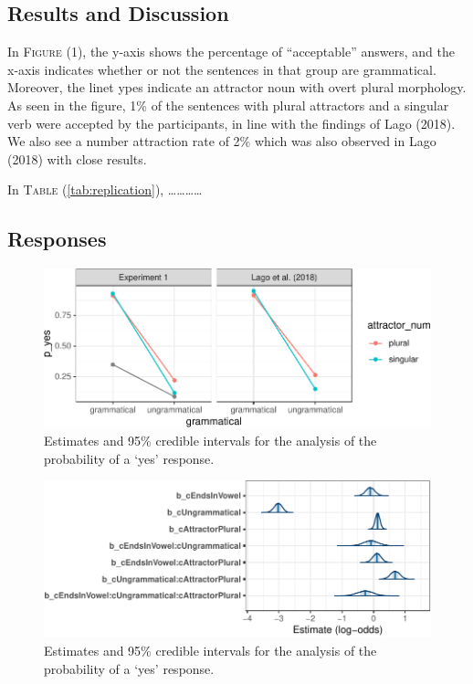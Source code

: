 \documentclass[doc]{apa6}
\begin{document}
\subsection{Results and Discussion}\label{results-and-discussion}

In \textsc{Figure} (1), the y-axis shows the percentage of
``acceptable'' answers, and the x-axis indicates whether or not the
sentences in that group are grammatical. Moreover, the linet ypes
indicate an attractor noun with overt plural morphology. As seen in the
figure, 1\% of the sentences with plural attractors and a singular verb
were accepted by the participants, in line with the findings of Lago
(2018). We also see a number attraction rate of 2\% which was also
observed in Lago (2018) with close results.

In \textsc{Table} (\ref{tab:replication}),
\ldots{}\ldots{}\ldots{}\ldots{}

\subsection{Responses}\label{responses}

\begin{figure}
\centering
\includegraphics{AgreementAttraction_files/figure-latex/exp1AvgResponse-1.pdf}
\caption{\label{fig:exp1AvgResponse}Estimates and 95\% credible intervals
for the analysis of the probability of a `yes' response.}
\end{figure}

\begin{figure}
\centering
\includegraphics{AgreementAttraction_files/figure-latex/exp1ResponseModelPlot-1.pdf}
\caption{\label{fig:exp1ResponseModelPlot}Estimates and 95\% credible
intervals for the analysis of the probability of a `yes' response.}
\end{figure}
\end{document}
